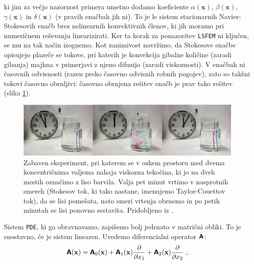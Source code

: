 ki jim za večjo nazornost primera umetno dodamo koeficiente $\alpha(\mathbf{x})$, $\beta(\mathbf{x})$, $\gamma(\mathbf{x})$ in $\delta(\mathbf{x})$ (v pravih enačbah jih ni). To je le sistem stacionarnih Navier-Stokesovih enačb brez nelinearnih konvektivnih členov, ki jih moramo pri numeričnem reševanju linearizirati. Ker ta korak za ponazoritev \texttt{LSFEM} ni ključen, se mu na tak način izognemo. Kot zanimivost navržimo, da Stokesove enačbe opisujejo plazeče se tokove, pri katerih je konvekcija gibalne količine (zaradi gibanja) majhna v primerjavi z njeno difuzijo (zaradi viskoznosti). V enačbah ni časovnih odvisnosti (razen preko časovno odvisnih robnih pogojev), zato so takšni tokovi časovno obrnljivi: časovno obrnjena rešitev enačb je prav tako rešitev (slika \ref{fig:TaylorCouette}).

\begin{figure}[!ht]
	\includegraphics[width = 1\textwidth]{Slike/TaylorCouette}
	\caption{Zabaven eksperiment, pri katerem se v ozkem prostoru med dvema koncentričnima valjema nahaja viskozna tekočina, ki jo na dveh mestih označimo z liso barvila. Valja pet minut vrtimo v nasprotnih smereh (Stokesov tok, ki tako nastane, imenujemo Taylor-Couettov tok), da se lisi pomešata, nato smeri vrtenja obrnemo in po petih minutah se lisi ponovno sestavita. Pridobljeno iz  \cite{Wiki-StokesFlow}.}
	\label{fig:TaylorCouette}
	\vspace{-0.3cm}
\end{figure}

Sistem \texttt{PDE}, ki ga obravnavamo, zapišemo bolj jedrnato v matrični obliki. To je enostavno, če je sistem linearen. Uvedemo diferencialni operator $\bm{\mathsf{A}}$:
\begin{equation}
	\bm{\mathsf{A}}(\mathbf{x}) = \bm{\mathsf{A}}_0(\mathbf{x}) + \bm{\mathsf{A}}_1(\mathbf{x}) \frac{\partial}{\partial x_1} + \bm{\mathsf{A}}_2(\mathbf{x}) \frac{\partial}{\partial x_2} \ ,
\end{equation}

\setlength{\textheight}{26.4cm}
\pagebreak
\setlength{\topmargin}{1.6cm}			%
\setlength{\headheight}{0.0cm}
\setlength{\headsep}{0.0cm}			%
\fancyhf{}
\fancyfoot[C]{\thepage}

